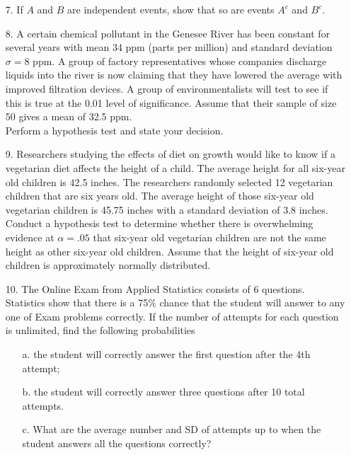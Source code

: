\documentclass[letterpaper,12pt]{article}
\begin{document}
\begin{enumerate}
\begin{enumerate}
    \end{enumerate}
  \item[7.]
    If $A$ and $B$ are independent events, show that so are events $A^c$ and $B^c$.
  \item[8.]
    A certain chemical pollutant in the Genesee River has been constant for several years with mean 34 ppm (parts per million) and standard deviation $\sigma = 8$ ppm. A group of factory representatives whose companies discharge liquids into the river is now claiming that they have lowered the average with improved filtration devices. A group of environmentalists will test to see if this is true at the 0.01 level of significance. Assume that their sample of size 50 gives a mean of 32.5 ppm. \\
    Perform a hypothesis test and state your decision.
  \item[9.]
    Researchers studying the effects of diet on growth would like to know if a vegetarian diet affects the height of a child. The average height for all six-year old children is 42.5 inches. The researchers randomly selected 12 vegetarian children that are six years old. The average height of those six-year old vegetarian children is 45.75 inches with a standard deviation of 3.8 inches. Conduct a hypothesis test to determine whether there is overwhelming evidence at $\alpha = .05$ that six-year old vegetarian children are not the same height as other six-year old children. Assume that the height of six-year old children is approximately normally distributed.
  \item[10.]
    The Online Exam from Applied Statistics consists of 6 questions. Statistics show that there is a 75\% chance that the student will answer to any one of Exam problems correctly. If the number of attempts for each question is unlimited, find the following probabilities
    \begin{enumerate}
      \item[a.]
        the student will correctly answer the first question after the 4th attempt;
      \item[b.]
        the student will correctly answer three questions after 10 total attempts.
      \item[c.]
        What are the average number and SD of attempts up to when the student answers all the questions correctly?
    \end{enumerate}
\end{enumerate}
\end{document}
